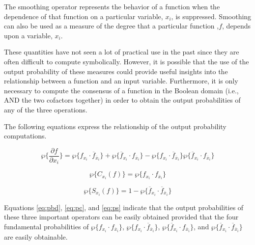 The smoothing operator represents the behavior of a function when the dependence of that
function on a particular variable, $x_i$, is suppressed.  Smoothing can also be used as a measure
of the degree that a particular function ,$f$, depends upon a variable, $x_i$.

These quantities have not seen a lot of practical use in the past since they are often difficult
to compute symbolically.  However, it is possible that the use of the output probability of these
measures could provide useful insights into the relationship between a function and an input variable.
Furthermore, it is only necessary to compute the consensus of a function in the Boolean domain
(i.e., AND the two cofactors together) in order to obtain the output probabilities of any of the three
operations.

The following equations express the relationship of the output probability computations.

\begin{equation}
\wp \{ \frac{\partial{f}}{\partial{x_i}} \} = \wp \{ f_{x_i} \cdot \overline{f}_{\overline{x}_i} \} + \wp \{ \overline{f}_{x_i} \cdot f_{\overline{x}_i} \} - \wp \{ f_{x_i} \cdot \overline{f}_{\overline{x}_i} \} \wp \{ \overline{f}_{x_i} \cdot f_{\overline{x}_i} \} \label{eq:pbd}
\end{equation}

\begin{equation}
\wp \{ C_{x_i}(f) \} = \wp \{ f_{x_i} \cdot f_{\overline{x}_i} \}  \label{eq:pc}
\end{equation}

\begin{equation}
\wp \{ S_{x_i}(f) \} = 1 - \wp \{ \overline{f}_{x_i} \cdot \overline{f}_{\overline{x}_i} \} \label{eq:ps}
\end{equation}

Equations \ref{eq:pbd}, \ref{eq:pc}, and \ref{eq:ps} indicate that the output probabilities
of these three important operators can be easily obtained provided that the four fundamental
probabilities of $\wp \{ f_{x_i} \cdot f_{\overline{x}_i} \}$, 
$\wp \{ f_{x_i} \cdot \overline{f}_{\overline{x}_i} \}$,
$ \wp \{ \overline{f}_{x_i} \cdot f_{\overline{x}_i} \}$, and 
$\wp \{ \overline{f}_{x_i} \cdot \overline{f}_{\overline{x}_i} \}$ are easily obtainable.
